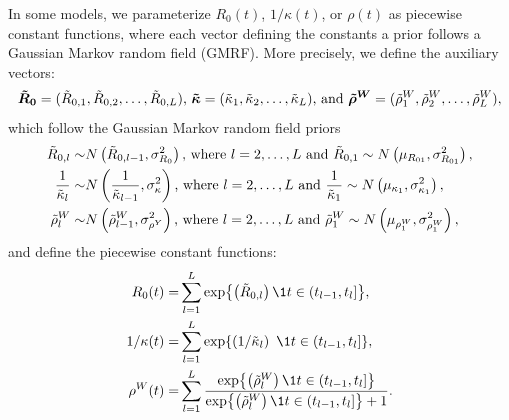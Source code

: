 In some models, we parameterize \( R_0(t) \), \( 1 / \kappa(t) \), or \( \rho(t) \) as piecewise constant functions, where each vector defining the constants a prior follows a Gaussian Markov random field (GMRF).
More precisely, we define the auxiliary vectors:
\begin{gather*}
\boldsymbol{\tilde{R}_0} = (\tilde{R}_{0,1}, \tilde{R}_{0,2}, \ldots, \tilde{R}_{0,L}) \text{, }
\boldsymbol{\tilde{\kappa}} = (\tilde{\kappa}_1, \tilde{\kappa}_2, \ldots, \tilde{\kappa}_L)  \text{, and }
\boldsymbol{\tilde{\rho}^W} = (\tilde{\rho}^W_1, \tilde{\rho}^W_2, \ldots, \tilde{\rho}^W_L),
\end{gather*}
which follow the Gaussian Markov random field priors
\begin{equation}
\begin{aligned}
	\tilde{R}_{0,l} \sim& N\left(\tilde{R}_{0, l - 1}, \sigma_{R_0}^2\right)\text{, where } l=2,\ldots,L \text{ and } \tilde{R}_{0,1} \sim N\left(\mu_{R_{01}},\sigma^2_{R_{01}}\right),\\
	\frac{1}{\tilde{\kappa}_{l}} \sim& N\left(\frac{1}{\tilde{\kappa}_{l - 1}}, \sigma_\kappa^2\right)\text{, where } l=2,\ldots,L \text{ and } \frac{1}{\tilde{\kappa}_1} \sim N\left(\mu_{\kappa_1},\sigma^2_{\kappa_1}\right),\\
	\tilde{\rho}^W_{l} \sim& N\left(\tilde{\rho}^W_{l - 1}, \sigma_{\rho^Y}^2\right)\text{, where } l=2,\ldots,L \text{ and } \tilde{\rho}^W_1 \sim N\left(\mu_{\rho^W_1}, \sigma^2_{\rho^W_1}\right),
 \label{ch_5:eqn:GMRF}
\end{aligned}
\end{equation}
and define the piecewise constant functions:
\begin{align}
	R_0(t) =& \sum_{l=1}^L \exp{\left( \tilde{R}_{0,l} \right) \1{t \in (t_{l-1}, t_l]}},\\
	1 / \kappa(t) =& \sum_{l=1}^L \exp{\left( 1 / \kappatilde_l \right)\ \1{t \in (t_{l-1}, t_l]} },\\
	\rho^W(t) =& \sum_{l=1}^L \frac{\exp{\left( \rhowtilde_l \right) \1{t \in (t_{l-1}, t_l]} }}{\exp{\left( \rhowtilde_l \right) \1{t \in (t_{l-1}, t_l]} } + 1}.
\end{align}

